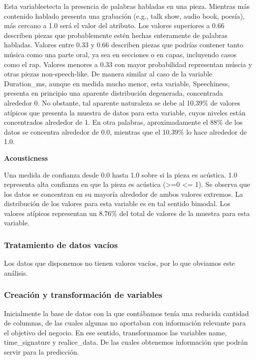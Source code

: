 \documentclass[
  letterpaper,
  DIV=11,
  numbers=noendperiod]{scrartcl}
\begin{document}
Esta variableetecta la presencia de palabras habladas en una pieza.
Mientras más contenido hablado presenta una grabación (e.g., talk show,
audio book, poesía), más cercano a 1.0 será el valor del atributo. Los
valores superiores a 0.66 describen piezas que probablemente estén
hechas enteramente de palabras habladas. Valores entre 0.33 y 0.66
describen piezas que podrías contener tanto música como una parte oral,
ya sea en secciones o en capas, incluyendo casos como el rap. Valores
menores a 0.33 con mayor probabilidad representan múscia y otras piezas
non-speech-like. De manera similar al caso de la variable Duration\_ms,
aunque en medida mucho menor, esta variable, Speechiness, presenta en
principio una aparente distribución degenerada, concentrada alrededor 0.
No obstante, tal aparente naturaleza se debe al 10.39\% de valores
atípicos que presenta la muestra de datos para esta variable, cuyos
niveles están concentrados alrededor de 1. En otra palabras,
aproximadamente el 88\% de los datos se concentra alrededor de 0.0,
mientras que el 10.39\% lo hace alrededor de 1.0.

\textbf{Acousticness}

Una medida de confianza desde 0.0 hasta 1.0 sobre si la pieza es
acústica. 1.0 representa alta confianza en que la pieza es acústica
(\textgreater=0 \textbar{} \textless= 1). Se observa que los datos se
concentran en su mayoría alrededor de ambos valores extremos. La
distribución de los valores para esta variable es en tal sentido
bimodal. Los valores atípicos representan un 8.76\% del total de valores
de la muestra para esta variable.

\hypertarget{tratamiento-de-datos-vacuxedos}{%
\subsubsection{Tratamiento de datos
vacíos}\label{tratamiento-de-datos-vacuxedos}}

Los datos que disponemos no tienen valores vacíos, por lo que obviamos
este análisis.

\hypertarget{creaciuxf3n-y-transformaciuxf3n-de-variables}{%
\subsubsection{Creación y transformación de
variables}\label{creaciuxf3n-y-transformaciuxf3n-de-variables}}

Inicialmente la base de datos con la que contábamos tenía una reducida
cantidad de columnas, de las cuales algunas no aportaban con información
relevante para el objetivo del negocio. En ese sentido, transformamos
las variables name, time\_signature y realice\_data. De las cuales
obtenemos información que podrán servir para la predicción.
\end{document}
